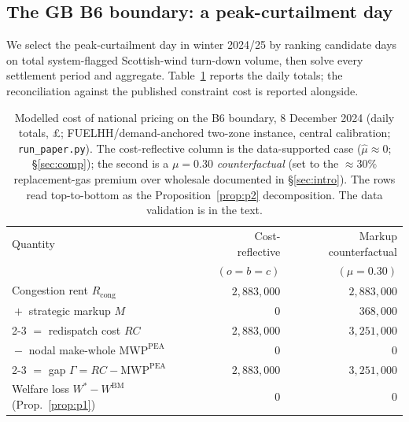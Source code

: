 \documentclass[review,3p,times]{elsarticle}
\theoremstyle{plain}
\theoremstyle{definition}
\begin{document}
\subsection{The GB B6 boundary: a peak-curtailment day}
\label{sec:b6day}

We select the peak-curtailment day in winter 2024/25 by ranking candidate days
on total system-flagged Scottish-wind turn-down volume, then solve every
settlement period and aggregate. Table~\ref{tab:results} reports the daily
totals; the reconciliation against the published constraint cost is reported
alongside.

\begin{table}[t]
\centering
\caption{Modelled cost of national pricing on the B6 boundary, 8 December 2024
(daily totals, \pounds; FUELHH/demand-anchored two-zone instance, central
calibration; \texttt{run\_paper.py}). The cost-reflective column is the
data-supported case ($\hat\mu\approx0$; \S\ref{sec:comp}); the second is a
$\mu=0.30$ \emph{counterfactual} (set to the $\approx30\%$ replacement-gas premium
over wholesale documented in \S\ref{sec:intro}). The rows read top-to-bottom as the
Proposition~\ref{prop:p2} decomposition. The data validation is in the text.}
\label{tab:results}
\begin{tabular}{lrr}
\toprule
Quantity & Cost-reflective & Markup counterfactual\\
 & $(o=b=c)$ & $(\mu=0.30)$\\
\midrule
Congestion rent $R_{\mathrm{cong}}$              & $2{,}883{,}000$ & $2{,}883{,}000$\\
\quad${}+{}$ strategic markup $M$                & $0$             & $368{,}000$\\
\cmidrule(l){2-3}
\quad${}={}$ redispatch cost $RC$                & $2{,}883{,}000$ & $3{,}251{,}000$\\
\quad${}-{}$ nodal make-whole $\mathrm{MWP}^{\mathrm{PEA}}$ & $0$  & $0$\\
\cmidrule(l){2-3}
\quad${}={}$ gap $\Gamma=RC-\mathrm{MWP}^{\mathrm{PEA}}$                        & $2{,}883{,}000$ & $3{,}251{,}000$\\
\addlinespace
Welfare loss $W^\ast-W^{\mathrm{BM}}$ (Prop.~\ref{prop:p1}) & $0$ & $0$\\
\bottomrule
\end{tabular}
\end{table}
\end{document}
